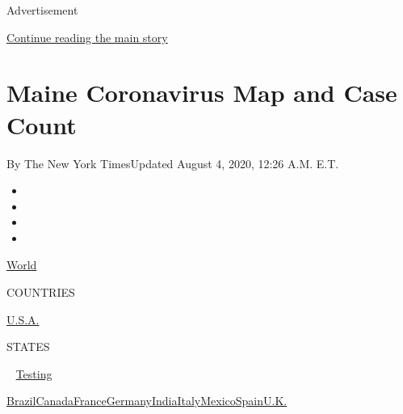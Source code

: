 Advertisement

\protect\hyperlink{after-top}{Continue reading the main story}

\hypertarget{maine-coronavirus-map-and-case-count}{%
\section{Maine Coronavirus Map and Case
Count}\label{maine-coronavirus-map-and-case-count}}

By The New York TimesUpdated August 4, 2020, 12:26 A.M. E.T.

\begin{itemize}
\item
\item
\item
\item
\end{itemize}

\href{https://www.nytimes3xbfgragh.onion/interactive/2020/world/coronavirus-maps.html}{World}~

COUNTRIES

\textbar{}
\href{https://www.nytimes3xbfgragh.onion/interactive/2020/us/coronavirus-us-cases.html}{U.S.A.}~

STATES

~
\href{https://www.nytimes3xbfgragh.onion/interactive/2020/us/coronavirus-testing.html}{Testing}

\href{https://www.nytimes3xbfgragh.onion/interactive/2020/world/americas/brazil-coronavirus-cases.html}{Brazil}\href{https://www.nytimes3xbfgragh.onion/interactive/2020/world/canada/canada-coronavirus-cases.html}{Canada}\href{https://www.nytimes3xbfgragh.onion/interactive/2020/world/europe/france-coronavirus-cases.html}{France}\href{https://www.nytimes3xbfgragh.onion/interactive/2020/world/europe/germany-coronavirus-cases.html}{Germany}\href{https://www.nytimes3xbfgragh.onion/interactive/2020/world/asia/india-coronavirus-cases.html}{India}\href{https://www.nytimes3xbfgragh.onion/interactive/2020/world/europe/italy-coronavirus-cases.html}{Italy}\href{https://www.nytimes3xbfgragh.onion/interactive/2020/world/americas/mexico-coronavirus-cases.html}{Mexico}\href{https://www.nytimes3xbfgragh.onion/interactive/2020/world/europe/spain-coronavirus-cases.html}{Spain}\href{https://www.nytimes3xbfgragh.onion/interactive/2020/world/europe/united-kingdom-coronavirus-cases.html}{U.K.}

